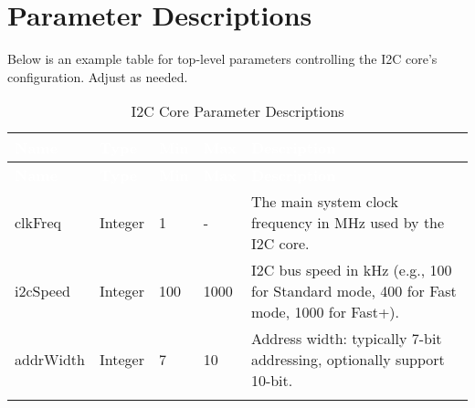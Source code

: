 \section{Parameter Descriptions}

Below is an example table for top-level parameters controlling the I2C core’s configuration. Adjust as needed.

\renewcommand*{\arraystretch}{1.4}
\begingroup
\small
{}

\begin{longtable}[H]{
    | p{}
    | p{}
    | p{}
    | p{}
    | p{} |
  }
  \hline
  \rowcolor{black}
  \textcolor{white}{\textbf{Name}} &
  \textcolor{white}{\textbf{Type}} &
  \textcolor{white}{\textbf{Min}} &
  \textcolor{white}{\textbf{Max}} &
  \textcolor{white}{\textbf{Description}} \\ 
  \hline \hline
  \endfirsthead

  \textcolor{white}{\textbf{Name}} &
  \textcolor{white}{\textbf{Type}} &
  \textcolor{white}{\textbf{Min}} &
  \textcolor{white}{\textbf{Max}} &
  \textcolor{white}{\textbf{Description}} \\ 
  \hline \hline
  \endhead

  \hline
  \endfoot

clkFreq &
Integer &
1 &
- &
The main system clock frequency in MHz used by the I2C core. \\ \hline

i2cSpeed &
Integer &
100 &
1000 &
I2C bus speed in kHz (e.g., 100 for Standard mode, 400 for Fast mode, 1000 for Fast+).\\ \hline

addrWidth &
Integer &
7 &
10 &
Address width: typically 7-bit addressing, optionally support 10-bit. \\ \hline

\caption{I2C Core Parameter Descriptions}
\label{table:params}
\end{longtable}
\endgroup
